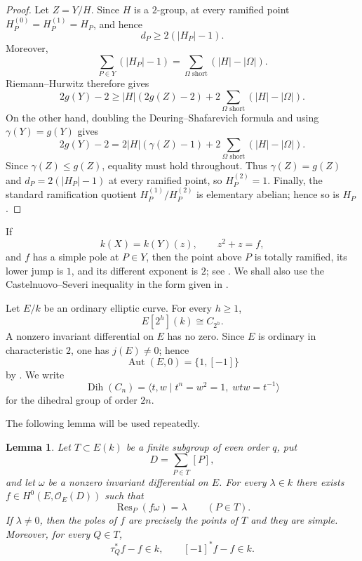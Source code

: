 \documentclass[11pt]{article}
\newtheorem{lemma}[theorem]{Lemma}
\theoremstyle{remark}
\newcommand{\Aut}{\operatorname{Aut}}
\newcommand{\Res}{\operatorname{Res}}
\newcommand{\Dih}{\operatorname{Dih}}
\begin{document}
\begin{proof}
Let $Z=Y/H$.  Since $H$ is a $2$-group, at every ramified point
$H_P^{(0)}=H_P^{(1)}=H_P$, and hence
\[
 d_P\ge 2(|H_P|-1).
\]
Moreover,
\[
 \sum_{P\in Y}(|H_P|-1)
 =\sum_{\Omega\text{ short}}(|H|-|\Omega|).
\]
Riemann--Hurwitz therefore gives
\[
 2g(Y)-2\ge |H|(2g(Z)-2)
 +2\sum_{\Omega\text{ short}}(|H|-|\Omega|).
\]
On the other hand, doubling the Deuring--Shafarevich formula and using
$\gamma(Y)=g(Y)$ gives
\[
 2g(Y)-2=2|H|(\gamma(Z)-1)
 +2\sum_{\Omega\text{ short}}(|H|-|\Omega|).
\]
Since $\gamma(Z)\le g(Z)$, equality must hold throughout.  Thus
$\gamma(Z)=g(Z)$ and $d_P=2(|H_P|-1)$ at every ramified point, so
$H_P^{(2)}=1$.  Finally, the standard ramification quotient
$H_P^{(1)}/H_P^{(2)}$ is elementary abelian; hence so is $H_P$.
\end{proof}

If
\[
        k(X)=k(Y)(z),\qquad z^2+z=f,
\]
and $f$ has a simple pole at $P\in Y$, then the point above $P$ is
totally ramified, its lower jump is $1$, and its different exponent is
$2$; see \cite[Proposition~III.7.8]{Stichtenoth}.  We shall also use the
Castelnuovo--Severi inequality in the form given in
\cite[Theorem~III.10.3]{Stichtenoth}.

Let $E/k$ be an ordinary elliptic curve.  For every $h\ge1$,
\[
        E[2^h](k)\cong C_{2^h}.
\]
A nonzero invariant differential on $E$ has no zero.  Since $E$ is
ordinary in characteristic $2$, one has $j(E)\ne0$; hence
\[
        \Aut(E,0)=\{1,[-1]\}
\]
by \cite[Theorem~III.10.1]{Silverman}.  We write
\[
        \Dih(C_n)=\langle t,w\mid t^n=w^2=1,\;wtw=t^{-1}\rangle
\]
for the dihedral group of order $2n$.

The following lemma will be used repeatedly.

\begin{lemma}\label{lem:principalparts}
Let $T\subset E(k)$ be a finite subgroup of even order $q$, put
\[
        D=\sum_{P\in T}[P],
\]
and let $\omega$ be a nonzero invariant differential on $E$.  For every
$\lambda\in k$ there exists $f\in H^0(E,\mathcal O_E(D))$ such that
\[
        \Res_P(f\omega)=\lambda\qquad(P\in T).
\]
If $\lambda\ne0$, then the poles of $f$ are precisely the points of $T$
and they are simple.  Moreover, for every $Q\in T$,
\[
        \tau_Q^*f-f\in k,\qquad [-1]^*f-f\in k.
\]
\end{lemma}
\end{document}
